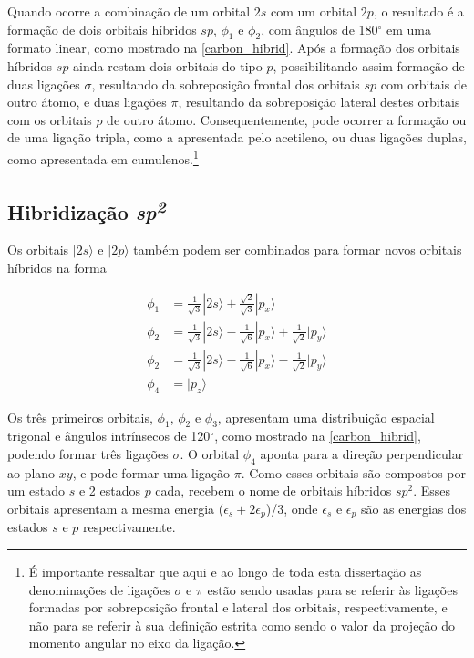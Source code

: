 		Quando ocorre a combinação de um orbital $2s$ com um orbital $2p$, o resultado é a formação de dois orbitais híbridos $sp$, $\phi_1$ e $\phi_2$, com ângulos de 180$^\circ$ em uma formato linear, como mostrado na \autoref{carbon_hibrid}. Após a formação dos orbitais híbridos $sp$ ainda restam dois orbitais do tipo $p$, possibilitando assim formação de duas ligações $\sigma$, resultando da sobreposição frontal dos orbitais $sp$ com orbitais de outro átomo, e duas ligações $\pi$, resultando da sobreposição lateral destes orbitais com os orbitais $p$ de outro átomo. Consequentemente, pode ocorrer a formação ou de uma ligação tripla, como a apresentada pelo acetileno, ou duas ligações duplas, como apresentada em cumulenos.\footnote{É importante ressaltar que aqui e ao longo de toda esta dissertação as denominações de ligações $\sigma$ e $\pi$ estão sendo usadas para se referir às ligações formadas por sobreposição frontal e lateral dos orbitais, respectivamente, e não para se referir à sua definição estrita como sendo o valor da projeção do momento angular no eixo da ligação.}

	\subsection{Hibridização \textit{sp\textsuperscript{2}}}
	
		Os orbitais $|2s\rangle$ e $|2p\rangle$ também podem ser combinados para formar novos orbitais híbridos na forma
		
		\begin{subequations}
			\label{sp2hibrid}
			\begin{flalign}
				\phi_1& = \frac{1}{\sqrt{3}}|2s\rangle + \frac{\sqrt{2}}{\sqrt{3}}|p_x\rangle\\
				\phi_2& = \frac{1}{\sqrt{3}}|2s\rangle - \frac{1}{\sqrt{6}}|p_x\rangle +  \frac{1}{\sqrt{2}}|p_y\rangle \\
				\phi_2& = \frac{1}{\sqrt{3}}|2s\rangle - \frac{1}{\sqrt{6}}|p_x\rangle -  \frac{1}{\sqrt{2}}|p_y\rangle \\
				\phi_4& = |p_z\rangle
			\end{flalign}
		\end{subequations}
		
		Os três primeiros orbitais, $\phi_1$, $\phi_2$ e $\phi_3$, apresentam uma distribuição espacial trigonal e ângulos intrínsecos de 120$^\circ$, como mostrado na \autoref{carbon_hibrid}, podendo formar três ligações $\sigma$. O orbital $\phi_4$ aponta para a direção perpendicular ao plano $xy$, e pode formar uma ligação $\pi$. Como esses orbitais são compostos por um estado $s$ e 2 estados $p$ cada, recebem o nome de orbitais híbridos $sp^2$. Esses orbitais apresentam a mesma energia ($\epsilon_s + 2\epsilon_p$)/3, onde $\epsilon_s$ e $\epsilon_p$ são as energias dos estados $s$ e $p$ respectivamente.
	

